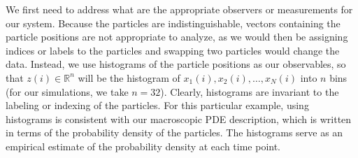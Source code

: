\documentclass[prl, reprint, final, showkeys]{revtex4-1}
\begin{document}
We first need to address what are the appropriate observers or measurements for our system.
%
Because the particles are indistinguishable, vectors containing the particle positions are not appropriate to analyze, as we would then be assigning indices or labels to the particles and swapping two particles would change the data.
%
Instead, we use histograms of the particle positions as our observables, so that $z(i) \in \mathbb{R}^n$ will be the histogram of $x_1(i), x_2(i), \dots, x_N(i)$ into $n$ bins (for our simulations, we take $n=32$).
%
Clearly, histograms are invariant to the labeling or indexing of the particles.
%
For this particular example, using histograms is consistent with our macroscopic PDE description, which is written in terms of the probability density of the particles.
%
The histograms serve as an empirical estimate of the probability density at each time point.

\end{document}
